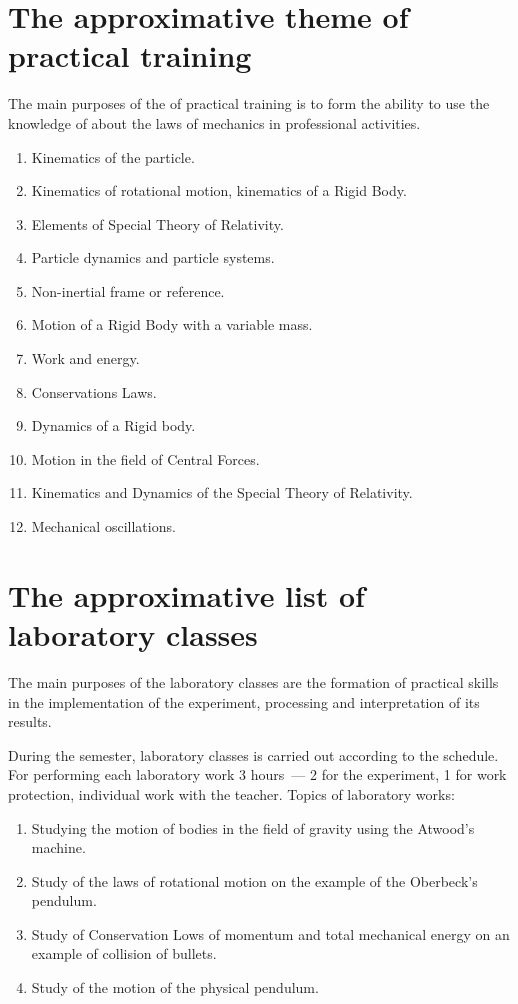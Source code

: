 \documentclass{rnp}
\begin{document}
% 
\section{The approximative theme of practical training}
%


The main purposes of the of practical training is to form the ability to use the knowledge of about  the laws of mechanics in professional activities.

\begin{enumerate}
\item  Kinematics of the particle.
\item  Kinematics of rotational motion, kinematics of a Rigid Body.
\item  Elements of Special Theory of Relativity.
\item  Particle dynamics and particle systems.
\item  Non-inertial frame or reference.
\item  Motion of a Rigid Body with a variable mass.
\item  Work and energy.
\item  Conservations Laws.
\item  Dynamics of a Rigid body.
\item  Motion in the field of Central Forces.
\item  Kinematics and Dynamics of the Special Theory of Relativity.
\item  Mechanical oscillations.
\end{enumerate}

%
\section{The approximative list of laboratory classes}
%


The main purposes of the laboratory classes are the formation of practical skills in the implementation of the experiment, processing and interpretation of its results.

During the semester, laboratory classes is carried out according to the schedule. For performing each laboratory work 3 hours~--- 2 for the experiment, 1 for work protection, individual work with the teacher. Topics of laboratory works:
\begin{enumerate}
\item Studying the motion of bodies in the field of gravity using the Atwood's machine.
\item Study of the laws of rotational motion on the example of the Oberbeck's pendulum.
\item Study of Conservation Lows of momentum and total mechanical energy on an example of collision of bullets.
\item Study of the motion of the physical pendulum.
\end{enumerate}
\end{document}
